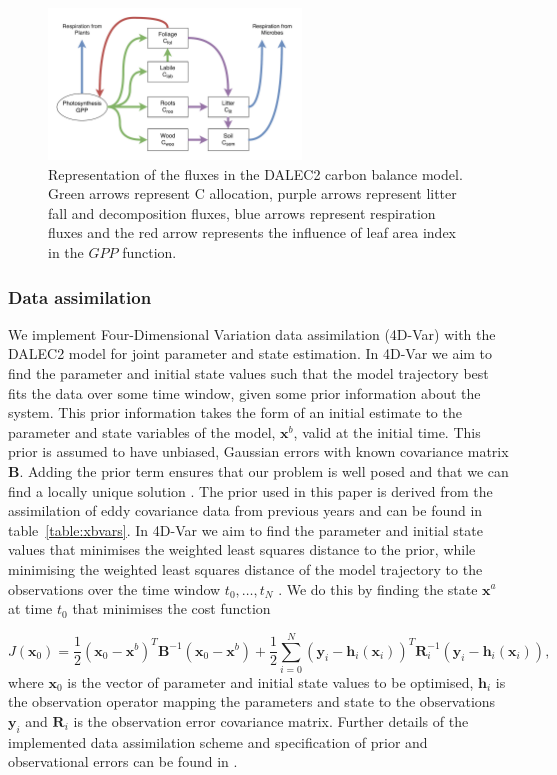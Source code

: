 \documentclass[12pt]{article}
\begin{document}
\begin{figure}[ht]
    \centering
    \includegraphics[width=0.6\textwidth]{dalec2diag.pdf}
    \caption{Representation of the fluxes in the DALEC2 carbon balance model. Green arrows represent C allocation, purple arrows represent litter fall and decomposition fluxes, blue arrows represent respiration fluxes and the red arrow represents the influence of leaf area index in the $GPP$ function.} \label{fig:DALEC_mod}
\end{figure}

\subsubsection{Data assimilation} \label{sec:da}

We implement Four-Dimensional Variation data assimilation (4D-Var) with the DALEC2 model for joint parameter and state estimation. In 4D-Var we aim to find the parameter and initial state values such that the model trajectory best fits the data over some time window, given some prior information about the system. This prior information takes the form of an initial estimate to the parameter and state variables of the model, $\textbf{x}^{b}$, valid at the initial time. This prior is assumed to have unbiased, Gaussian errors with known covariance matrix $\textbf{B}$. Adding the prior term ensures that our problem is well posed and that we can find a locally unique solution \citep{Tremolet2006}. The prior used in this paper is derived from the assimilation of eddy covariance data from previous years and can be found in table~\ref{table:xbvars}. In 4D-Var we aim to find the parameter and initial state values that minimises the weighted least squares distance to the prior, while minimising the weighted least squares distance of the model trajectory to the observations over the time window $t_{0}, \dots, t_{N}$ \citep{lawless2013}. We do this by finding the state $\textbf{x}^{a}$ at time $t_{0}$ that minimises the cost function

\begin{equation}
J(\textbf{x}_0) = \frac{1}{2}(\textbf{x}_0-\textbf{x}^b)^{T}\textbf{B}^{-1}(\textbf{x}_0-\textbf{x}^b)+\frac{1}{2}\sum_{i=0}^{N}(\textbf{y}_i-\textbf{h}_i(\textbf{x}_i))^{T}\textbf{R}_{i}^{-1}(\textbf{y}_i-\textbf{h}_i(\textbf{x}_i)),
\end{equation}
where $\textbf{x}_{0}$ is the vector of parameter and initial state values to be optimised, $\textbf{h}_{i}$ is the observation operator mapping the parameters and state to the observations $\textbf{y}_{i}$ and $\textbf{R}_{i}$ is the observation error covariance matrix. Further details of the implemented data assimilation scheme and specification of prior and observational errors can be found in \citet{Pinnington2016299}. 
\end{document}
